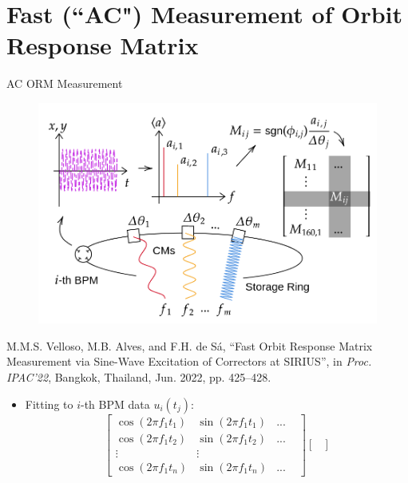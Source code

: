 \documentclass[aspectratio=169]{beamer}
\begin{document}
\section{Fast (``AC") Measurement of Orbit Response Matrix}
\begin{frame}{AC ORM Measurement}
    \begin{minipage}{0.44\textwidth}
        \begin{figure}
            \centering
            \includegraphics[width=\textwidth]{MOPOTK002_f1.png}
        \end{figure}
        \tiny
        M.M.S. Velloso, M.B. Alves, and F.H. de Sá,
   \textquotedblleft{Fast Orbit Response Matrix Measurement via Sine-Wave Excitation of Correctors at SIRIUS}\textquotedblright, in \emph{Proc. IPAC'22}, Bangkok, Thailand, Jun. 2022, pp. 425--428.
    \end{minipage}
    \begin{minipage}{0.55\textwidth}
        \begin{itemize}
            \scriptsize
            \item Fitting to $i$-th BPM data $u_i(t_j)$:
                \begin{equation*}
                    \begin{bmatrix}
                        \cos (2\pi f_{1} t_{1}) & \sin( 2\pi f_{1} t_{1}) & ... &\\
                        \cos (2\pi f_{1} t_{2}) & \sin (2\pi f_{1} t_{2}) & ...& \\
                        \vdots  & \vdots  & & \\
                        \cos (2\pi f_{1} t_{n}) & \sin (2\pi f_{1} t_{n}) & ... &
                        \end{bmatrix}\begin{bmatrix}

\end{bmatrix}
\end{equation*}
\end{itemize}
\end{minipage}
\end{frame}
\end{document}
